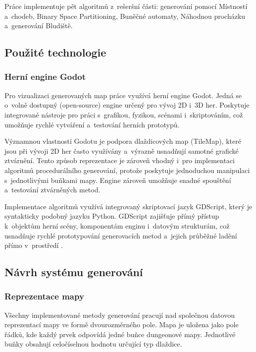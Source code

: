 \documentclass[
   program=itk,
   biblatex,
   figures=true,
   tables=true,
   glossaries,
   index
]{kidiplom}
\begin{document}
Práce implementuje pět algoritmů z~rešeršní části: generování pomocí Místností a~chodeb, Binary Space Partitioning, Buněčné automaty, Náhodnou procházku a~generování Bludiště.

\subsection{Použité technologie}

\subsubsection{Herní engine Godot}

Pro vizualizaci generovaných map práce využívá herní engine Godot. Jedná se o~volně dostupný (open-source) engine určený pro vývoj 2D i~3D her. Poskytuje integrované nástroje pro práci s~grafikou, fyzikou, scénami i~skriptováním, což umožňuje rychlé vytváření a~testování herních prototypů.

Významnou vlastností Godotu je podpora dlaždicových map (TileMap), které jsou při vývoji 2D her často využívány a~výrazně usnadňují samotné grafické ztvárnění. Tento způsob reprezentace je zároveň vhodný i~pro implementaci algoritmů procedurálního generování, protože poskytuje jednoduchou manipulaci s~jednotlivými buňkami mapy. Engine zároveň umožňuje snadné spouštění a~testování ztvárněných metod.

Implementace algoritmů využívá integrovaný skriptovací jazyk GDScript, který je syntakticky podobný jazyku Python. GDScript zajišťuje přímý přístup k~objektům herní scény, komponentám enginu i~datovým strukturám, což usnadňuje rychlé prototypování generovacích metod a~jejich průběžné ladění přímo v~prostředí \cite{godot_engine,godot_gdscript}.

\subsection{Návrh systému generování}

\subsubsection{Reprezentace mapy}

Všechny implementované metody generování pracují nad společnou datovou reprezentací mapy ve formě dvourozměrného pole. Mapa je uložena jako pole řádků, kde každý prvek odpovídá jedné buňce dungeonové mapy. Jednotlivé buňky obsahují celočíselnou hodnotu určující typ dlaždice.
\end{document}
